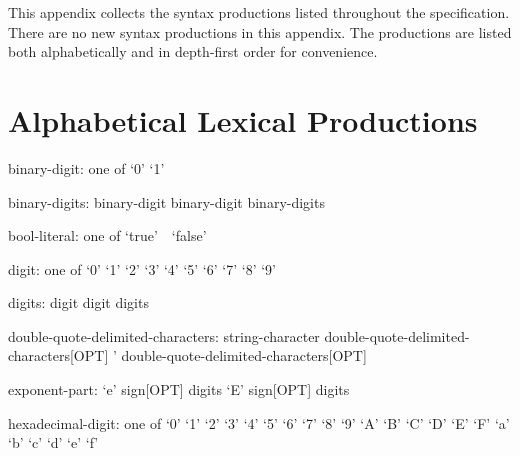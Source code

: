 
\label{Syntax}

This appendix collects the syntax productions listed throughout the specification.  There are no new syntax productions in this appendix.  The productions are listed both alphabetically and in depth-first order for convenience.

\section{Alphabetical Lexical Productions}

\begin{syntax}
\end{syntax}

\begin{syntax}
binary-digit: one of
  `0' `1'
\end{syntax}

\begin{syntax}
binary-digits:
  binary-digit
  binary-digit binary-digits
\end{syntax}

\begin{syntax}
bool-literal: one of
  `true' $ $ $ $ `false'
\end{syntax}

\begin{syntax}
digit: one of
  `0' `1' `2' `3' `4' `5' `6' `7' `8' `9'
\end{syntax}

\begin{syntax}
digits:
  digit
  digit digits
\end{syntax}

\begin{syntax}
double-quote-delimited-characters:
  string-character double-quote-delimited-characters[OPT]
  ' double-quote-delimited-characters[OPT]
\end{syntax}

\begin{syntax}
exponent-part:
  `e' sign[OPT] digits
  `E' sign[OPT] digits
\end{syntax}

\begin{syntax}
hexadecimal-digit: one of
  `0' `1' `2' `3' `4' `5' `6' `7' `8' `9' `A' `B' `C' `D' `E' `F' `a' `b' `c' `d' `e' `f'
\end{syntax}

